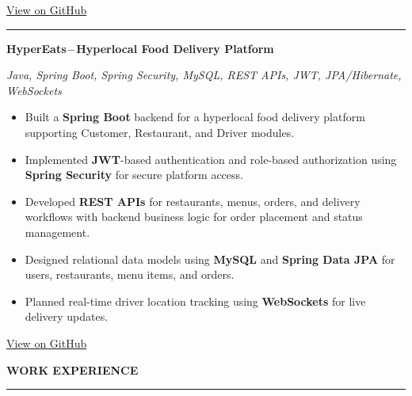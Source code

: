 \documentclass[a4paper]{article}
\newcommand{\sectionrule}[1]{%
    \vspace{2pt}%
    {\color{navy}\large\bfseries #1}\par
    \vspace{2pt}%
    {\color{navy}\rule{\linewidth}{0.70pt}}%
    \vspace{4pt}\par
}
\newcommand{\projecttitle}[1]{%
    {\color{navy}\bfseries\normalsize #1}%
}
\newcommand{\techline}[1]{%
    {\color{muted}\small\itshape #1}%
}
\newcommand{\bullets}{%
    \begin{itemize}[
        leftmargin=1.2em,
        itemsep=1.5pt,
        topsep=1.5pt,
        parsep=0pt,
        partopsep=0pt,
        label={\color{navy}\textbullet}
    ]
}
\begin{document}
\begin{minipage}[t]{135mm}
\begin{minipage}[t]{123mm}
        \vspace{2pt}
        {\small\color{navy}\faGithub}\;\;\href{https://github.com/PrakashMannam/campuscoders}{\small\color{navy}View on GitHub}\par

        \vspace{5pt}
        {\color{rulecolor}\rule{\linewidth}{0.45pt}}
        \vspace{6pt}

        \projecttitle{HyperEats\,--\,Hyperlocal Food Delivery Platform}\par
        \vspace{1pt}
        \techline{Java, Spring Boot, Spring Security, MySQL, REST APIs, JWT, JPA/Hibernate, WebSockets}\par
        \vspace{2pt}

        \bullets
            \item Built a \textbf{Spring Boot} backend for a hyperlocal food delivery platform supporting Customer, Restaurant, and Driver modules.
            \item Implemented \textbf{JWT}-based authentication and role-based authorization using \textbf{Spring Security} for secure platform access.
            \item Developed \textbf{REST APIs} for restaurants, menus, orders, and delivery workflows with backend business logic for order placement and status management.
            \item Designed relational data models using \textbf{MySQL} and \textbf{Spring Data JPA} for users, restaurants, menu items, and orders.
            \item Planned real-time driver location tracking using \textbf{WebSockets} for live delivery updates.
        \end{itemize}

        \vspace{2pt}
        {\small\color{navy}\faGithub}\;\;\href{https://github.com/PrakashMannam/HyperEats}{\small\color{navy}View on GitHub}\par

        \vspace{7pt}

        \sectionrule{WORK EXPERIENCE}


\end{minipage}
\end{minipage}
\end{document}

